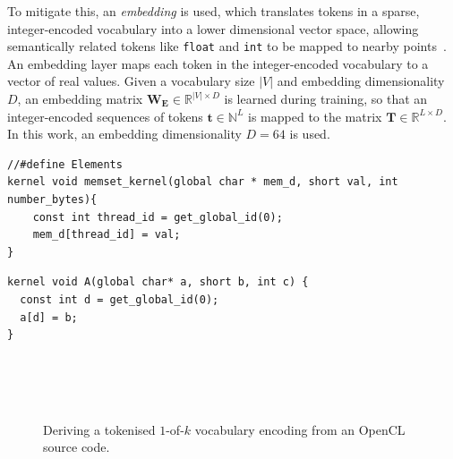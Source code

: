 To mitigate this, an \emph{embedding} is used, which translates tokens in a sparse, integer-encoded vocabulary into a lower dimensional vector space, allowing semantically related tokens like \texttt{float} and \texttt{int} to be mapped to nearby points~\cite{Mikolov2013a,Baroni2014}. An embedding layer maps each token in the integer-encoded vocabulary to a vector of real values. Given a vocabulary size $|V|$ and embedding dimensionality $D$, an embedding matrix $\bm{W_{E}} \in \mathbb{R}^{|V| \times D}$ is learned during training, so that an integer-encoded sequences of tokens $\bm{t} \in \mathbb{N}^{L}$ is mapped to the matrix $\bm{T} \in \mathbb{R}^{L \times D}$. In this work, an embedding dimensionality $D = 64$ is used.

\newsavebox{\NvidiaStreamClusterInput}
\begin{lrbox}{\NvidiaStreamClusterInput}
  \begin{minipage}{\textwidth}
    \begin{verbatim}
//#define Elements
kernel void memset_kernel(global char * mem_d, short val, int number_bytes){
    const int thread_id = get_global_id(0);
    mem_d[thread_id] = val;
}
    \end{verbatim}
  \end{minipage}
\end{lrbox}

\newsavebox{\NvidiaStreamClusterOutput}
\begin{lrbox}{\NvidiaStreamClusterOutput}
  \begin{minipage}{\textwidth}
    \begin{verbatim}
kernel void A(global char* a, short b, int c) {
  const int d = get_global_id(0);
  a[d] = b;
}
    \end{verbatim}
  \end{minipage}
\end{lrbox}

\begin{figure}
  \centering %
  \\%
  \\%
  \\%
  \caption[Deriving a vocabulary encoding from an OpenCL source code]{%
    Deriving a tokenised $1$-of-$k$ vocabulary encoding from an OpenCL source
    code.%
  }%
  \label{fig:encoding}%
\end{figure}


